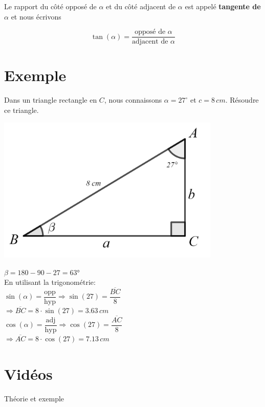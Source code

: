 \documentclass[a4paper,11pt]{article}
\begin{document}
Le rapport du côté opposé de $\alpha$ et du côté adjacent de $\alpha$ est appelé \textbf{tangente de $\alpha$} et nous écrivons

$$\tan(\alpha)=\frac{\text{opposé de }\alpha}{\text{adjacent de }\alpha}$$


\section{Exemple}
Dans un triangle rectangle en $C$, nous connaissons $\alpha=27^{\circ}$ et $c=8\,cm$. Résoudre ce triangle.\\
\begin{multicols}{2}
\begin{center}
\includegraphics[width=0.8\textwidth]{images/trianglerectexemple.png}\\
\end{center}
$\beta=180-90-27=63°$\\
En utilisant la trigonométrie:\\
$\sin(\alpha)=\dfrac{\text{opp}}{\text{hyp}} \Rightarrow \sin(27)=\dfrac{\overline{BC}}{8}$\\
$\Rightarrow \overline{BC}=8 \cdot \sin(27)=3.63\,cm$\\
$\cos(\alpha)=\dfrac{\text{adj}}{\text{hyp}} \Rightarrow \cos(27)=\dfrac{\overline{AC}}{8}$\\
$\Rightarrow \overline{AC}=8 \cdot \cos(27)=7.13\,cm$\\
\end{multicols}

\section{Vidéos}
Théorie et exemple\\
 
\end{document}
